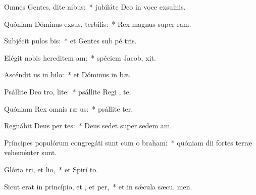 \item Omnes Gentes, dite nibus:~* jubiláte Deo in voce exsulnis.
\item Quóniam Dóminus exsus, terbilis:~* Rex magnus super  ram.
\item Subjécit pulos bis:~* et Gentes sub pé tris.
\item Elégit nobis hereditem am:~* spéciem Jacob,  xit.
\item Ascéndit us in bilo:~* et Dóminus in  bæ.
\item Psállite Deo tro, lite:~* psállite Regi , te.
\item Quóniam Rex omnis ræ us:~* psállite ter.
\item Regnábit Deus per tes:~* Deus sedet super sedem  am.
\item Príncipes populórum congregáti sunt cum o braham:~* quóniam dii fortes terræ veheménter  sunt.
\item Glória tri, et lio,~* et Spirí to.
\item Sicut erat in princípio, et , et per,~* et in sǽcula sæcu. men.
